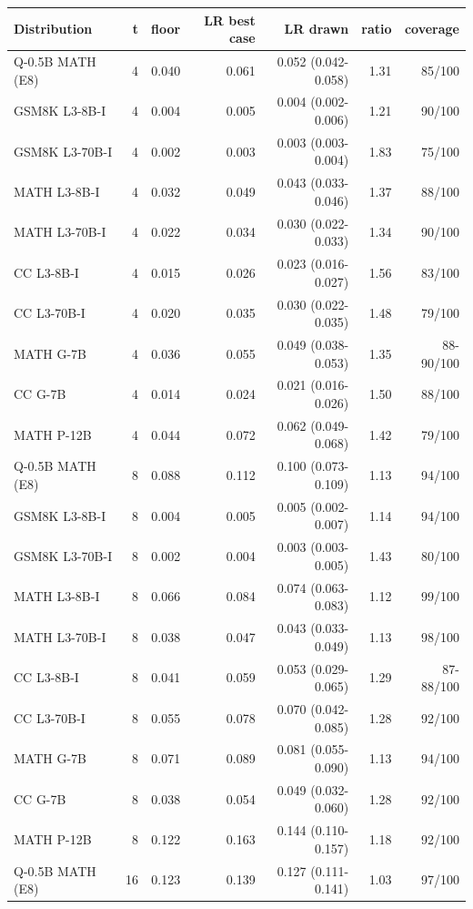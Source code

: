 \begin{table}[t]
\centering
\small
\begin{tabular}{lrrrrrr}
\toprule
Distribution & t & floor & LR best case & LR drawn & ratio & coverage \\
\midrule
Q-0.5B MATH (E8) & 4 & 0.040 & 0.061 & 0.052 (0.042-0.058) & 1.31 & 85/100 \\
GSM8K L3-8B-I & 4 & 0.004 & 0.005 & 0.004 (0.002-0.006) & 1.21 & 90/100 \\
GSM8K L3-70B-I & 4 & 0.002 & 0.003 & 0.003 (0.003-0.004) & 1.83 & 75/100 \\
MATH L3-8B-I & 4 & 0.032 & 0.049 & 0.043 (0.033-0.046) & 1.37 & 88/100 \\
MATH L3-70B-I & 4 & 0.022 & 0.034 & 0.030 (0.022-0.033) & 1.34 & 90/100 \\
CC L3-8B-I & 4 & 0.015 & 0.026 & 0.023 (0.016-0.027) & 1.56 & 83/100 \\
CC L3-70B-I & 4 & 0.020 & 0.035 & 0.030 (0.022-0.035) & 1.48 & 79/100 \\
MATH G-7B & 4 & 0.036 & 0.055 & 0.049 (0.038-0.053) & 1.35 & 88-90/100 \\
CC G-7B & 4 & 0.014 & 0.024 & 0.021 (0.016-0.026) & 1.50 & 88/100 \\
MATH P-12B & 4 & 0.044 & 0.072 & 0.062 (0.049-0.068) & 1.42 & 79/100 \\
Q-0.5B MATH (E8) & 8 & 0.088 & 0.112 & 0.100 (0.073-0.109) & 1.13 & 94/100 \\
GSM8K L3-8B-I & 8 & 0.004 & 0.005 & 0.005 (0.002-0.007) & 1.14 & 94/100 \\
GSM8K L3-70B-I & 8 & 0.002 & 0.004 & 0.003 (0.003-0.005) & 1.43 & 80/100 \\
MATH L3-8B-I & 8 & 0.066 & 0.084 & 0.074 (0.063-0.083) & 1.12 & 99/100 \\
MATH L3-70B-I & 8 & 0.038 & 0.047 & 0.043 (0.033-0.049) & 1.13 & 98/100 \\
CC L3-8B-I & 8 & 0.041 & 0.059 & 0.053 (0.029-0.065) & 1.29 & 87-88/100 \\
CC L3-70B-I & 8 & 0.055 & 0.078 & 0.070 (0.042-0.085) & 1.28 & 92/100 \\
MATH G-7B & 8 & 0.071 & 0.089 & 0.081 (0.055-0.090) & 1.13 & 94/100 \\
CC G-7B & 8 & 0.038 & 0.054 & 0.049 (0.032-0.060) & 1.28 & 92/100 \\
MATH P-12B & 8 & 0.122 & 0.163 & 0.144 (0.110-0.157) & 1.18 & 92/100 \\
Q-0.5B MATH (E8) & 16 & 0.123 & 0.139 & 0.127 (0.111-0.141) & 1.03 & 97/100 \\

\end{tabular}
\end{table}
